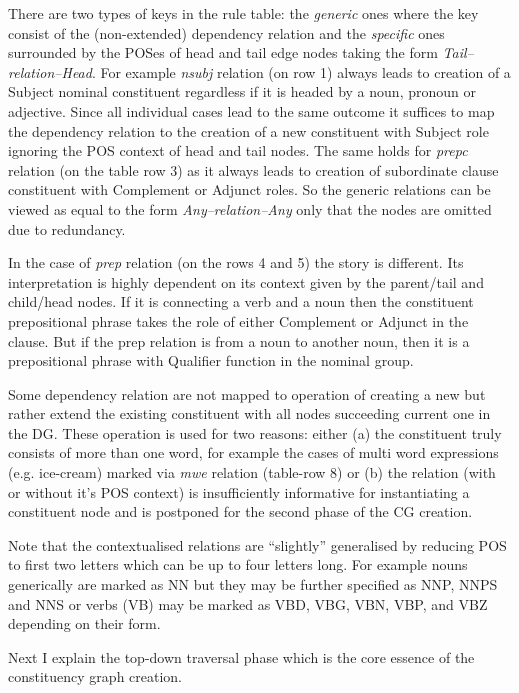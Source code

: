 There are two types of keys in the rule table: the \textit{generic} ones where the key consist of the (non-extended) dependency relation and the \textit{specific} ones surrounded by the POSes of head and tail edge nodes taking the form \mbox{\textit{Tail--relation--Head}}. For example \textit{nsubj} relation (on row 1) always leads to creation of a Subject nominal constituent regardless if it is headed by a noun, pronoun or adjective. Since all individual cases lead to the same outcome it suffices to map the dependency relation to the creation of a new constituent with Subject role ignoring the POS context of head and tail nodes. The same holds for \textit{prepc} relation (on the table row 3) as it always leads to creation of subordinate clause constituent with Complement or Adjunct roles. So the generic relations can be viewed as equal to the form \mbox{\textit{Any--relation--Any}} only that the nodes are omitted due to redundancy.

In the case of \textit{prep} relation (on the rows 4 and 5) the story is different. Its interpretation is highly dependent on its context given by the parent/tail and child/head nodes. If it is connecting a verb and a noun then the constituent prepositional phrase takes the role of either Complement or Adjunct in the clause. But if the prep relation is from a noun to another noun, then it is a prepositional phrase with Qualifier function in the nominal group.

Some dependency relation are not mapped to operation of creating a new but rather extend the existing constituent with all nodes succeeding current one in the DG. These operation is used for two reasons: either (a) the constituent truly consists of more than one word, for example the cases of multi word expressions (e.g. ice-cream) marked via \textit{mwe} relation (table-row 8) or (b) the relation (with or without it's POS context) is insufficiently informative for instantiating a constituent node and is postponed for the second phase of the CG creation.

Note that the contextualised relations are ``slightly'' generalised by reducing POS to first two letters which can be up to four letters long. For example nouns generically are marked as NN but they may be further specified as NNP, NNPS and NNS or verbs (VB) may be marked as VBD, VBG, VBN, VBP, and VBZ depending on their form. 

Next I explain the top-down traversal phase which is the core essence of the constituency graph creation. 

